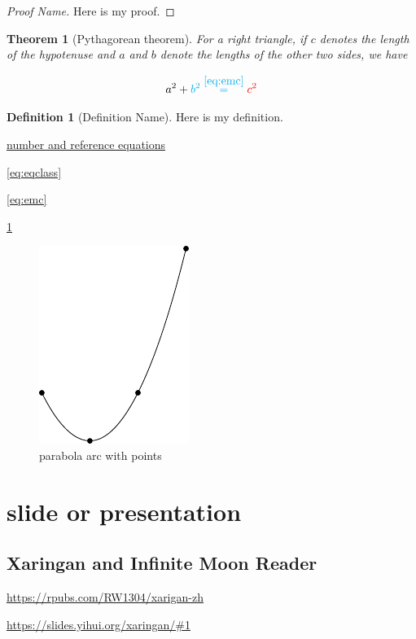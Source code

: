 \documentclass[
]{book}
\newtheorem{theorem}{Theorem}[chapter]
\theoremstyle{definition}
\newtheorem{definition}{Definition}[chapter]
\theoremstyle{definition}
\theoremstyle{definition}
\theoremstyle{definition}
\theoremstyle{remark}
\begin{document}
\begin{proof}[Proof Name]
Here is my proof.
\end{proof}

\begin{theorem}[Pythagorean theorem]
\protect\hypertarget{thm:pyth}{}\label{thm:pyth}For a right triangle, if \(c\) denotes the length of the hypotenuse
and \(a\) and \(b\) denote the lengths of the other two sides, we have

\[a^2 + \color{cyan}b^2 \overset{\ref{eq:emc}}= \color{red}{c^2} \]
\end{theorem}

\begin{definition}[Definition Name]
\protect\hypertarget{def:unnamed-chunk-54}{}\label{def:unnamed-chunk-54}Here is my definition.
\end{definition}

\hyperref[nice-label]{number and reference equations}

\eqref{eq:eqclass}

\eqref{eq:emc}

\ref{thm:pyth}

\begin{figure}
\includegraphics[width=0.25\linewidth]{202401280001-test_files/figure-latex/parabola-arc-with-points-1} \caption{parabola arc with points}\label{fig:parabola-arc-with-points}
\end{figure}

\section{slide or presentation}\label{slide-or-presentation}

\subsection{Xaringan and Infinite Moon Reader}\label{xaringan-and-infinite-moon-reader}

\url{https://rpubs.com/RW1304/xarigan-zh}

\url{https://slides.yihui.org/xaringan/\#1}
\end{document}
